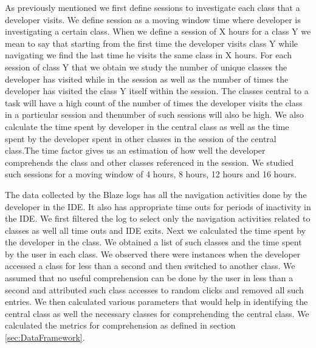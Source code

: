 As previously mentioned we first define sessions to investigate each class that a developer visits. We define session as a moving window time where developer is investigating a certain class. When we define a session of X hours for a class Y we mean to say that starting from the first time the developer visits class Y while navigating we find the last time he visits the same class in X hours. For each session of class Y that we obtain we study the number of unique classes the developer has visited while in the session as well as the number of times the developer has visited the class Y itself within the session. The classes central to a task will have a high count of the number of times the developer visits the class in a particular session and thenumber of such sessions will also be high. We also calculate the time spent by developer in the central class as well as the time spent by the developer spent in other classes in the session of the central class.The time factor gives us an estimation of how well the developer comprehends the class and other classes referenced in the session. We studied such sessions for a moving window of 4 hours, 8 hours, 12 hours and 16 hours. 

The data collected by the Blaze logs has all the navigation activities done by the developer in the IDE. It also has appropriate time outs for periods of inactivity in the IDE. We first filtered the log to select only the navigation activities related to classes as well all time outs and IDE exits. Next we calculated the time spent by the developer in the class. We obtained a list of such classes and the time spent by the user in each class. We observed there were instances when the developer accessed a class for less than a second and then switched to another class. We assumed that no useful comprehension can be done by the user in less than a second and attributed such class accesses to random clicks and removed all such entries. We then calculated various parameters that would help in identifying the central class as well the necessary classes for comprehending the central class.   We calculated the metrics for comprehension as defined in section \ref{sec:DataFramework}.

